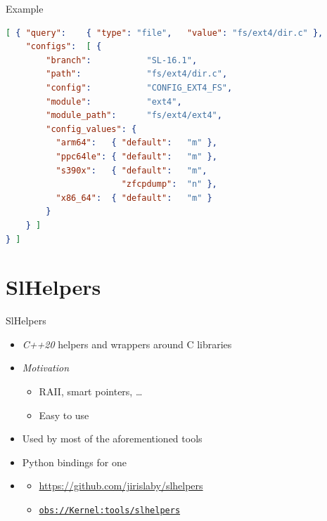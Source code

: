 \begin{frame}[fragile]{}{Example}

  \begin{block}{}
    \pause
    \begin{lstlisting}[language=json]
[ { "query":    { "type": "file",   "value": "fs/ext4/dir.c" },
    "configs":  [ {
        "branch":           "SL-16.1",
        "path":             "fs/ext4/dir.c",
        "config":           "CONFIG_EXT4_FS",
        "module":           "ext4",
        "module_path":      "fs/ext4/ext4",
        "config_values": {
          "arm64":   { "default":   "m" },
          "ppc64le": { "default":   "m" },
          "s390x":   { "default":   "m",
                       "zfcpdump":  "n" },
          "x86_64":  { "default":   "m" }
        }
    } ]
} ]
      \end{lstlisting}
  \end{block}

\end{frame}

\section{SlHelpers}
\frame{\sectionpage}

\begin{frame}{SlHelpers}

  \begin{itemize}[<+->]
    \item \emph{C++20} helpers and wrappers around C libraries
    \item \emph{Motivation}
      \begin{itemize}[<.->]
	\item RAII, smart pointers, \dots
	\item Easy to use
      \end{itemize}
    \item Used by most of the aforementioned tools
    \item Python bindings for one
    \item {}
      \begin{itemize}[<.->]
	\item \url{https://github.com/jirislaby/slhelpers}
	\item \href{https://build.opensuse.org/package/show/Kernel:tools/slhelpers}{\nolinkurl{obs://Kernel:tools/slhelpers}}
      \end{itemize}
  \end{itemize}

\end{frame}

